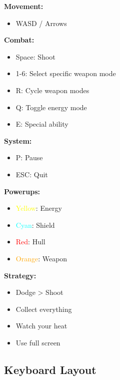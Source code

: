 \documentclass[11pt,a4paper]{article}
\begin{document}
\begin{tcolorbox}[mybox, title=\textbf{Quick Reference}]
\begin{multicols}{2}
\textbf{Movement:}
\begin{itemize}[nosep]
    \item WASD / Arrows
\end{itemize}

\textbf{Combat:}
\begin{itemize}[nosep]
    \item Space: Shoot
    \item 1-6: Select specific weapon mode
    \item R: Cycle weapon modes
    \item Q: Toggle energy mode
    \item E: Special ability
\end{itemize}

\textbf{System:}
\begin{itemize}[nosep]
    \item P: Pause
    \item ESC: Quit
\end{itemize}

\columnbreak

\textbf{Powerups:}
\begin{itemize}[nosep]
    \item \textcolor{yellow}{Yellow}: Energy
    \item \textcolor{cyan}{Cyan}: Shield
    \item \textcolor{red}{Red}: Hull
    \item \textcolor{orange}{Orange}: Weapon
\end{itemize}

\textbf{Strategy:}
\begin{itemize}[nosep]
    \item Dodge > Shoot
    \item Collect everything
    \item Watch your heat
    \item Use full screen
\end{itemize}
\end{multicols}
\end{tcolorbox}

\subsection{Keyboard Layout}
\end{document}
